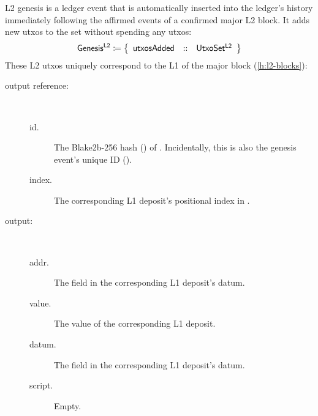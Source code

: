 \documentclass[../hydrozoa.tex]{subfiles}
\begin{document}
L2 genesis is a ledger event that is automatically inserted into the ledger's history immediately following the affirmed events of a confirmed major L2 block.
It adds new utxos to the  set without spending any utxos:
\begin{equation*}
  \mathsf{Genesis^{L2}} \coloneq \left\{
  \begin{array}{lll}
    \mathsf{utxosAdded} &::& \mathsf{UtxoSet^{L2}}
  \end{array}\right\}
\end{equation*}
These L2 utxos uniquely correspond to the L1  of the major block (\cref{h:l2-blocks}):
\begin{description}
  \item[output reference:]~
    \begin{description}
      \item[id.] The Blake2b-256 hash () of .
      Incidentally, this is also the genesis event's unique ID ().
      \item[index.] The corresponding L1 deposit's positional index in .
    \end{description}
  \item[output:]~
    \begin{description}
      \item[addr.] The  field in the corresponding L1 deposit's datum.
      \item[value.] The value of the corresponding L1 deposit.
      \item[datum.] The  field in the corresponding L1 deposit's datum.
      \item[script.] Empty.
    \end{description}
  \end{description}
\end{document}
